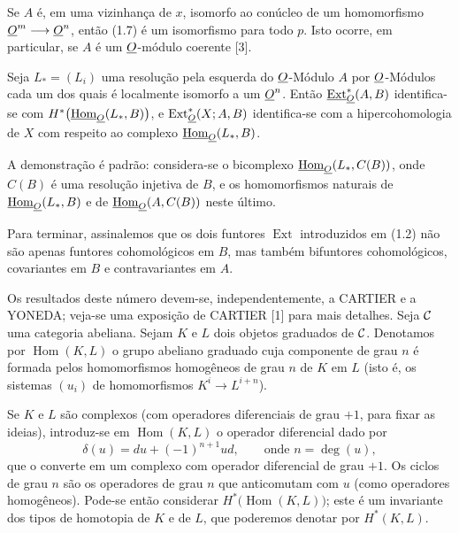  Se $A$ é, em uma vizinhança de $x$, isomorfo ao
conúcleo de um homomorfismo $\underline{O}^{m}\longrightarrow\underline{O}^{n}$, então (1.7) é um
isomorfismo para todo $p$. Isto ocorre, em
particular, se $A$ é um $\underline{O}$-módulo coerente [3].

 Seja $L_{*}=(L_i)$ uma resolução pela esquerda do
$\underline{O}$-Módulo $A$ por $\underline{O}$-Módulos cada um dos quais é localmente isomorfo a
um $\underline{O}^{n}$. Então $\underline{\operatorname{Ext}}_{\underline{O}}^{*}(A,B)$ identifica-se com
$H^{*}\bigl(\underline{\operatorname{Hom}}_{\underline{O}}(L_{*},B)\bigr)$, e
$\operatorname{Ext}_{\underline{O}}^{*}(X;A,B)$ identifica-se com a hipercohomologia de $X$
com respeito ao complexo $\underline{\operatorname{Hom}}_{\underline{O}}(L_{*},B)$.

A demonstração é padrão: considera-se o bicomplexo
$\underline{\operatorname{Hom}}_{\underline{O}}(L_{*},C(B))$, onde $C(B)$ é uma resolução injetiva de $B$, e os
homomorfismos naturais de $\underline{\operatorname{Hom}}_{\underline{O}}(L_{*},B)$ e de
$\underline{\operatorname{Hom}}_{\underline{O}}(A,C(B))$ neste último.

Para terminar, assinalemos que os dois funtores $\operatorname{Ext}$ introduzidos
em (1.2) não são apenas funtores cohomológicos em $B$, mas também
bifuntores cohomológicos, covariantes em $B$ e contravariantes em $A$.


Os resultados deste número devem-se, independentemente, a CARTIER e a YONEDA; veja-se
uma exposição de CARTIER [1] para mais detalhes. Seja $\mathcal C$ uma categoria abeliana.
Sejam $K$ e $L$ dois objetos graduados de $\mathcal C$. Denotamos por
$\operatorname{Hom}(K,L)$ o grupo abeliano graduado cuja componente de grau
$n$ é formada pelos homomorfismos homogêneos de grau $n$ de $K$ em $L$ (isto é,
os sistemas $(u_i)$ de homomorfismos $K^{i}\longrightarrow L^{i+n}$).

Se $K$ e $L$ são complexos (com operadores diferenciais de grau $+1$, para
fixar as ideias), introduz-se em $\operatorname{Hom}(K,L)$ o operador
diferencial dado por
\begin{equation}\tag{2.1}
  \delta(u)=du+(-1)^{n+1}ud,\qquad\text{onde }n=\deg(u),
\end{equation}
que o converte em um complexo com operador diferencial de grau $+1$. Os ciclos de
grau $n$ são os operadores de grau $n$ que anticomutam com $u$ (como
operadores homogêneos). Pode-se então considerar
$H^{*}\bigl(\operatorname{Hom}(K,L)\bigr)$; este é um invariante dos tipos
de homotopia de $K$ e de $L$, que poderemos denotar por $H^{*}(K,L)$.

